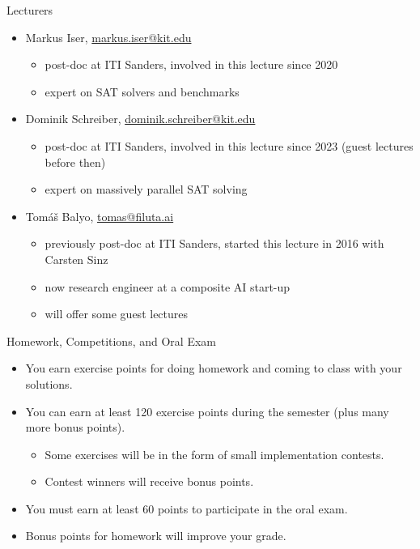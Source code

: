 \documentclass[t]{sdqbeamer}
\begin{document}
\begin{frame}{Lecturers}
\begin{itemize}\setlength{\itemsep}{1em}
	\item Markus Iser, \href{mailto:markus.iser@kit.edu}{markus.iser@kit.edu}
	\begin{itemize}
		\item post-doc at ITI Sanders, involved in this lecture since 2020
		\item expert on SAT solvers and benchmarks
	\end{itemize}
	\item Dominik Schreiber, \href{mailto:dominik.schreiber}{dominik.schreiber@kit.edu}
	\begin{itemize}
		\item post-doc at ITI Sanders, involved in this lecture since 2023 (guest lectures before then)
		\item expert on massively parallel SAT solving
	\end{itemize}
	\item Tom\'a\v{s} Balyo, \href{mailto:tomas@filuta.ai}{tomas@filuta.ai}
	\begin{itemize}
		\item previously post-doc at ITI Sanders, started this lecture in 2016 with Carsten Sinz
		\item now research engineer at a composite AI start-up
		\item will offer some guest lectures 
	\end{itemize}
\end{itemize}
\end{frame}

\begin{frame}{Homework, Competitions, and Oral Exam}
\begin{itemize}\setlength{\itemsep}{1em}
	\item You earn exercise points for doing homework and coming to class with your solutions.
	\item You can earn at least 120 exercise points during the semester (plus many more bonus points).
	\begin{itemize}
		\item Some exercises will be in the form of small implementation contests.
		\item Contest winners will receive bonus points.
	\end{itemize}
	\item You must earn at least 60 points to participate in the oral exam.
	\item Bonus points for homework will improve your grade.
\end{itemize}
\end{frame}
\end{document}
